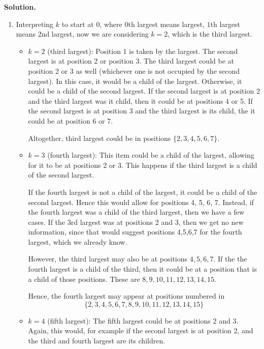 \documentclass[12pt, a4paper]{article}
\newenvironment{sol}[1][Solution]
{\par\medskip\noindent \textbf{#1.} }
{\medskip}
\begin{document}
	\begin{sol}
		\begin{enumerate}[label=(\roman*)]
			\item Interpreting $k$ to start at $0$, where $0$th largest means largest,
			$1$th largest means 2nd largest, now we are considering $k=2$, which
			is the third largest.
			\begin{itemize}
				\item $k=2$ (third largest): Position 1 is taken by the largest. The second largest
				is at position 2 or position 3. The third largest could be at position 2
				or 3 as well (whichever one is not occupied by the second largest).
				In this case, it would be a child of the largest. Otherwise, it could
				be a child of the second largest. If the second largest is at position 2
				and the third largest was it child, then it could be at positions
				4 or 5. If the second largest is at position 3 and the third largest is
				its child, the it could be at position 6 or 7.
				
				Altogether, third largest could be in positions $\{2,3,4,5,6,7\}$.
				
				\item $k=3$ (fourth largest): This item could be a child of the largest,
				allowing for it to be at positions 2 or 3. This happens if the third
				largest is a child of the second largest.
				
				
				If the fourth largest is not a child of the largest, it could be a child of
				the second largest. Hence this would allow for positions 4, 5, 6, 7. Instead, if
				the fourth largest was a child of the third largest, then we have a few
				cases. If the 3rd largest was at positions 2 and 3, then we get no new
				information, since that would suggest positions 4,5,6,7 for the fourth
				largest, which we already know.
				
				However, the third largest may also be at positions $4,5,6,7$. If the the
				fourth largest is a child of the third, then it could be at a position that
				is a child of those positions. These are $8,9,10,11,12,13,14,15$.
				
				Hence, the fourth largest may appear at positions numbered in
				\[
				\{2,3,4,5,6,7,8,9,10,11,12,13,14,15\}
				\]
				
				
				\item $k=4$ (fifth largest): The fifth largest could be at positions
				2 and 3. Again, this would, for example if the second largest is at position
				2, and the third and fourth largest are its children.
				

\end{itemize}
\end{enumerate}
\end{sol}
\end{document}
